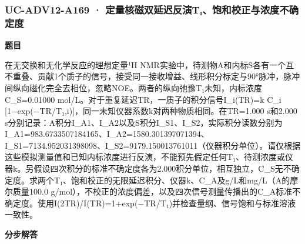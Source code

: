 \documentclass[UTF8,11pt,a4paper]{ctexart}
\begin{document}
\subsubsection*{UC-ADV12-A169 · 定量核磁双延迟反演T₁、饱和校正与浓度不确定度}
\noindent\textbf{题目}\par
在无交换和无化学反应的理想定量¹H NMR实验中，待测物A和内标S各有一个互不重叠、贡献1个质子的信号，接受同一接收增益、线形积分标定与90°脉冲，脉冲间纵向磁化完全去相位，忽略NOE。两者的纵向弛豫T₁未知，内标浓度C\_S=0.01000 mol/L。对于重复延迟TR，一质子的积分信号I\_i(TR)=k C\_i [1−exp(−TR/T₁,i)]，同一未知仪器系数k对两种物质相同。在TR=1.000 s和2.000 s分别记录：A积分I\_A1、I\_A2以及S积分I\_S1、I\_S2，实际积分读数分别为I\_A1=983.6733507184165、I\_A2=1580.301397071394、I\_S1=7134.952031398098、I\_S2=9179.150013761011（仪器积分单位）。请仅根据这些模拟测量值和已知内标浓度进行反演，不能预先假定任何T₁、待测浓度或仪器k。另假设四次积分的标准不确定度各为2.000积分单位，相互独立，C\_S无不确定度。求两个T₁、饱和校正的无限延迟积分、仪器k、C\_A及g/L和mg/L（A的摩尔质量100.0 g/mol），不校正的浓度偏差，以及四次信号测量传播出的C\_A标准不确定度。使用I(2TR)/I(TR)=1+exp(−TR/T₁)并检查量纲、信号饱和与标准溶液一致性。\par
\medskip\noindent\textbf{分步解答}
\end{document}
